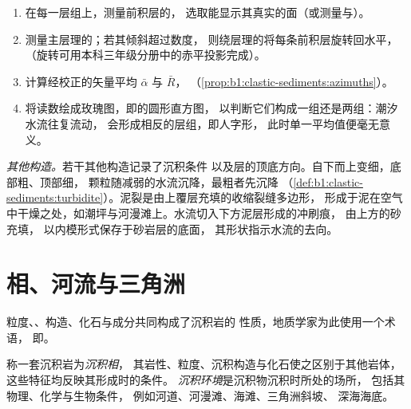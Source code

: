 \begin{method}[由交错层理求古水流]\label{met:b1:clastic-sediments:palaeocurrent}
\begin{enumerate}
  \item 在每一层组上，测量前积层的，
        选取能显示其真实的面（或测量与）。
  \item 测量主层理的；若其倾斜超过数度，
        则绕层理的将每条前积层旋转回水平，
        （旋转可用本科三年级分册中的赤平投影完成）。
  \item 计算经校正的矢量平均 $\bar\alpha$ 与 $\bar R$，
        （\cref{prop:b1:clastic-sediments:azimuths}）。
  \item 将读数绘成玫瑰图，即的圆形直方图，
        以判断它们构成一组还是两组：潮汐水流往复流动，
        会形成相反的层组，即人字形，
        此时单一平均值便毫无意义。
\end{enumerate}
\end{method}

\emph{其他构造。}若干其他构造记录了沉积条件
以及层的顶底方向。自下而上变细，底部粗、顶部细，
颗粒随减弱的水流沉降，最粗者先沉降
（\cref{def:b1:clastic-sediments:turbidite}）。泥裂是由上覆层充填的收缩裂缝多边形，
形成于泥在空气中干燥之处，如潮坪与河漫滩上。水流切入下方泥层形成的冲刷痕，
由上方的砂充填，
以内模形式保存于砂岩层的底面，
其形状指示水流的去向。

\section{相、河流与三角洲}\label{sec:b1:clastic-sediments:rivers-deltas}

粒度、、构造、化石与成分共同构成了沉积岩的
性质，地质学家为此使用一个术语，
即。

\begin{definition}\label{def:b1:clastic-sediments:facies}
称一套沉积岩为\emph{沉积相}，
其岩性、粒度、沉积构造与化石使之区别于其他岩体，
这些特征均反映其形成时的条件。
\emph{沉积环境}是沉积物沉积时所处的场所，
包括其物理、化学与生物条件，
例如河道、河漫滩、海滩、三角洲斜坡、
深海海底。
\end{definition}

